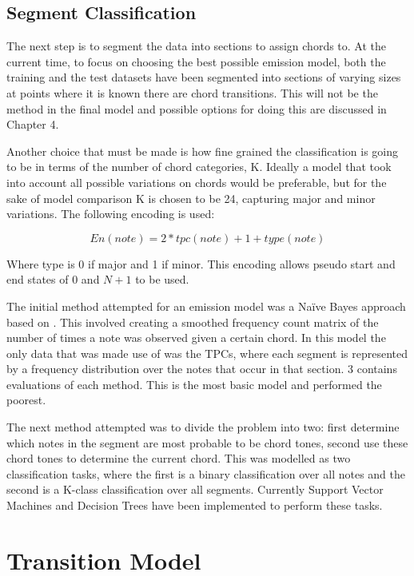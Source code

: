 \documentclass[bsc,singlespacing,parskip,deptreport]{infthesis}
\begin{document}
\subsection{Segment Classification}

The next step is to segment the data into sections to assign chords to. At the current time, to focus on choosing the best possible emission model, both the training and the test datasets have been segmented into sections of varying sizes at points where it is known there are chord transitions. This will not be the method in the final model and possible options for doing this are discussed in Chapter 4.

Another choice that must be made is how fine grained the classification is going to be in terms of the number of chord categories, K. Ideally a model that took into account all possible variations on chords would be preferable, but for the sake of model comparison K is chosen to be 24, capturing major and minor variations. The following encoding is used:

$$
En(note) = 2 * tpc(note) + 1 + type(note)
$$

Where type is 0 if major and 1 if minor. This encoding allows pseudo start and end states of 0 and $N+1$ to be used.

The initial method attempted for an emission model was a Na\"ive Bayes approach based on \cite{mysong}. This involved creating a smoothed frequency count matrix of the number of times a note was observed given a certain chord. In this model the only data that was made use of was the TPCs, where each segment is represented by a frequency distribution over the notes that occur in that section.  3 contains evaluations of each method. This is the most basic model and performed the poorest.

The next method attempted was to divide the problem into two: first determine which notes in the segment are most probable to be chord tones, second use these chord tones to determine the current chord. This was modelled as two classification tasks, where the first is a binary classification over all notes and the second is a K-class classification over all segments. Currently Support Vector Machines and Decision Trees have been implemented to perform these tasks.

\section{Transition Model}
\end{document}
